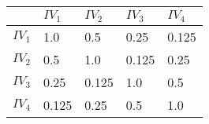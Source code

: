 \documentclass[ShortAfour,times,sageapa]{sagej}
\begin{document}
%	
	
%	
	
	\smallskip
	
	\begin{center}
		\begin{tabular}[5]{r|llll}
			& $IV_1$ & $IV_2$ & $IV_3$ & $IV_4$ \\
			\toprule
			$IV_1$ & 1.0 & 0.5 & 0.25 & 0.125 \\
			$IV_2$ & 0.5 & 1.0 & 0.125 & 0.25 \\
			$IV_3$ & 0.25 & 0.125 & 1.0 & 0.5 \\
			$IV_4$ & 0.125 & 0.25 & 0.5 & 1.0
		\end{tabular}
	\end{center}
	
\end{document}
